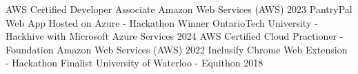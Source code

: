 

\begin{cvhonors}

  \cvhonor
  {AWS Certified Developer Associate} %
  {Amazon Web Services (AWS)} %
  {} %
  {2023} %
  \cvhonor
  {PantryPal Web App Hosted on Azure - Hackathon Winner} %
  {OntarioTech University - Hackhive with Microsoft Azure Services} %
  {} %
  {2024} %
  \cvhonor
  {AWS Certified Cloud Practioner - Foundation} %
  {Amazon Web Services (AWS)} %
  {} %
  {2022} %
  \cvhonor
  {Inclusify Chrome Web Extension - Hackathon Finalist} %
  {University of Waterloo - Equithon} %
  {} %
  {2018} %
\end{cvhonors}
